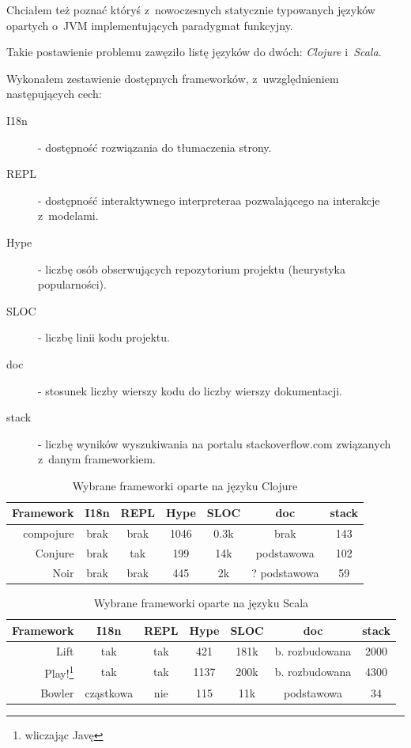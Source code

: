 \documentclass[a4paper]{article}
\begin{document}
Chciałem też poznać któryś z~nowoczesnych statycznie typowanych języków opartych o~JVM implementujących paradygmat funkcyjny.

Takie postawienie problemu zawęziło listę języków do dwóch: \emph{Clojure} i~\emph{Scala}.

Wykonałem zestawienie dostępnych frameworków, z~uwzględnieniem następujących cech:

\begin{description}
  \item[I18n] - dostępność rozwiązania do tłumaczenia strony.
  \item[REPL] - dostępność interaktywnego interpreteraa pozwalającego na interakcje z~modelami.
  \item[Hype] - liczbę osób obserwujących repozytorium projektu (heurystyka popularności).
  \item[SLOC] - liczbę linii kodu projektu.
  \item[doc] - stosunek liczby wierszy kodu do liczby wierszy dokumentacji.
  \item[stack] - liczbę wyników wyszukiwania na portalu stackoverflow.com związanych z~danym frameworkiem.
\end{description}

\begin{table}[h]
  \centering
  \begin{tabular}{|r|c|c|c|c|c|c|}
    \hline
    Framework & I18n & REPL & Hype & SLOC & doc  & stack \\ \hline
    compojure & brak & brak & 1046 & 0.3k & brak & 143 \\ \hline
    Conjure   & brak & tak  & 199  & 14k  & podstawowa & 102 \\ \hline
    Noir & brak & brak  & 445 & 2k & ? podstawowa & 59 \\ \hline
  \end{tabular}
  \caption{ Wybrane frameworki oparte na języku Clojure}
\end{table}

\begin{table}[h]
  \centering
  \begin{tabular}{|r|c|c|c|c|c|c|}
    \hline
    Framework & I18n & REPL & Hype & SLOC & doc  & stack \\ \hline
    Lift & tak & tak & 421 & 181k & b. rozbudowana & 2000 \\ \hline
    Play!\footnote{wliczając Javę} & tak & tak & 1137 & 200k & b. rozbudowana & 4300 \\ \hline
    Bowler & cząstkowa & nie & 115 & 11k & podstawowa & 34\\ \hline
  \end{tabular}
  \caption{ Wybrane frameworki oparte na języku Scala}
\end{table}
\end{document}
